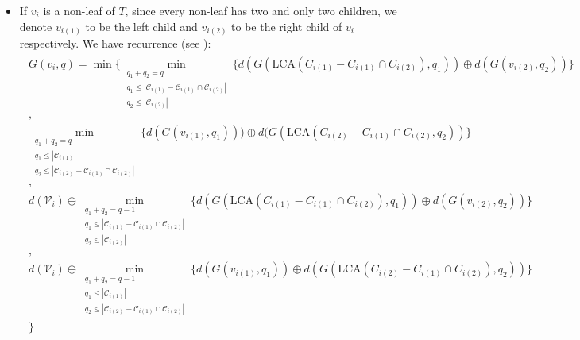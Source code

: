 \begin{itemize}
\begin{itemize}
        \item If $v_i$ is a non-leaf of $T$, since every non-leaf
        has two and only two children, we denote $v_{i(1)}$ to be the
        left child and $v_{i(2)}$ to be the right child of $v_i$ 
        respectively. We have recurrence (see ):
        \begin{align}
        \begin{split}
        G(v_i, q) = \min \{ 
            \min_{\substack{
                       q_1 + q_2 = q\\
                        q_1 \leq |\mathcal{C}_{i(1)} - \mathcal{C}_{i(1)} \cap \mathcal{C}_{i(2)}|\\
                        q_2 \leq |\mathcal{C}_{i(2)}| }}
                  \{ d(G(\mbox{LCA}(C_{i(1)} - C_{i(1)} \cap C_{i(2)}), q_1)) \oplus 
                     d(G(v_{i(2)}, q_2))
                  \}\\
                      , \\
            \min_{\substack{
                       q_1 + q_2 = q\\
                        q_1 \leq |\mathcal{C}_{i(1)}|\\
                        q_2 \leq |\mathcal{C}_{i(2)} - \mathcal{C}_{i(1)} \cap \mathcal{C}_{i(2)}| }}
                  \{ d(G(v_{i(1)}, q_1))) \oplus 
                     d(G(\mbox{LCA}(C_{i(2)} - C_{i(1)} \cap C_{i(2)}, q_2))
                  \}\\
                      , \\
            d(\mathcal{V}_i) \oplus
            \min_{\substack{
                       q_1 + q_2 = q-1\\
                        q_1 \leq |\mathcal{C}_{i(1)} - \mathcal{C}_{i(1)} \cap \mathcal{C}_{i(2)}|\\
                        q_2 \leq |\mathcal{C}_{i(2)}| }}
                  \{ d(G(\mbox{LCA}(C_{i(1)} - C_{i(1)} \cap C_{i(2)}), q_1)) \oplus
                     d(G(v_{i(2)}, q_2))
                  \}\\
                      , \\
            d(\mathcal{V}_i) \oplus
            \min_{\substack{
                       q_1 + q_2 = q-1\\
                        q_1 \leq |\mathcal{C}_{i(1)}|\\
                        q_2 \leq |\mathcal{C}_{i(2)} - \mathcal{C}_{i(1)} \cap \mathcal{C}_{i(2)}|}}
                  \{ d(G(v_{i(1)}, q_1)) \oplus
                     d(G(\mbox{LCA}(C_{i(2)} - C_{i(1)} \cap C_{i(2)}), q_2))
                  \}\\
        \}
        \end{split}
        \label{eq:recG}
        \end{align}


\end{itemize}
\end{itemize}
